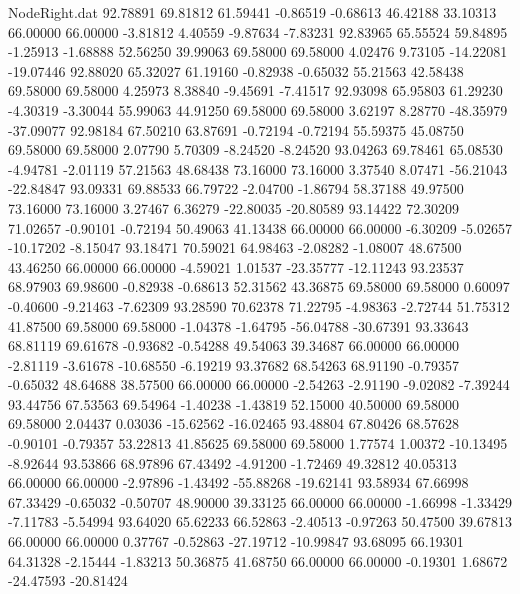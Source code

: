 \begin{filecontents}{NodeRight.dat}
  92.78891   69.81812   61.59441    -0.86519   -0.68613   46.42188   33.10313   66.00000   66.00000   -3.81812    4.40559   -9.87634   -7.83231
  92.83965   65.55524   59.84895    -1.25913   -1.68888   52.56250   39.99063   69.58000   69.58000    4.02476    9.73105  -14.22081  -19.07446
  92.88020   65.32027   61.19160    -0.82938   -0.65032   55.21563   42.58438   69.58000   69.58000    4.25973    8.38840   -9.45691   -7.41517
  92.93098   65.95803   61.29230    -4.30319   -3.30044   55.99063   44.91250   69.58000   69.58000    3.62197    8.28770  -48.35979  -37.09077
  92.98184   67.50210   63.87691    -0.72194   -0.72194   55.59375   45.08750   69.58000   69.58000    2.07790    5.70309   -8.24520   -8.24520
  93.04263   69.78461   65.08530    -4.94781   -2.01119   57.21563   48.68438   73.16000   73.16000    3.37540    8.07471  -56.21043  -22.84847
  93.09331   69.88533   66.79722    -2.04700   -1.86794   58.37188   49.97500   73.16000   73.16000    3.27467    6.36279  -22.80035  -20.80589
  93.14422   72.30209   71.02657    -0.90101   -0.72194   50.49063   41.13438   66.00000   66.00000   -6.30209   -5.02657  -10.17202   -8.15047
  93.18471   70.59021   64.98463    -2.08282   -1.08007   48.67500   43.46250   66.00000   66.00000   -4.59021    1.01537  -23.35777  -12.11243
  93.23537   68.97903   69.98600    -0.82938   -0.68613   52.31562   43.36875   69.58000   69.58000    0.60097   -0.40600   -9.21463   -7.62309
  93.28590   70.62378   71.22795    -4.98363   -2.72744   51.75312   41.87500   69.58000   69.58000   -1.04378   -1.64795  -56.04788  -30.67391
  93.33643   68.81119   69.61678    -0.93682   -0.54288   49.54063   39.34687   66.00000   66.00000   -2.81119   -3.61678  -10.68550   -6.19219
  93.37682   68.54263   68.91190    -0.79357   -0.65032   48.64688   38.57500   66.00000   66.00000   -2.54263   -2.91190   -9.02082   -7.39244
  93.44756   67.53563   69.54964    -1.40238   -1.43819   52.15000   40.50000   69.58000   69.58000    2.04437    0.03036  -15.62562  -16.02465
  93.48804   67.80426   68.57628    -0.90101   -0.79357   53.22813   41.85625   69.58000   69.58000    1.77574    1.00372  -10.13495   -8.92644
  93.53866   68.97896   67.43492    -4.91200   -1.72469   49.32812   40.05313   66.00000   66.00000   -2.97896   -1.43492  -55.88268  -19.62141
  93.58934   67.66998   67.33429    -0.65032   -0.50707   48.90000   39.33125   66.00000   66.00000   -1.66998   -1.33429   -7.11783   -5.54994
  93.64020   65.62233   66.52863    -2.40513   -0.97263   50.47500   39.67813   66.00000   66.00000    0.37767   -0.52863  -27.19712  -10.99847
  93.68095   66.19301   64.31328    -2.15444   -1.83213   50.36875   41.68750   66.00000   66.00000   -0.19301    1.68672  -24.47593  -20.81424

\end{filecontents}
